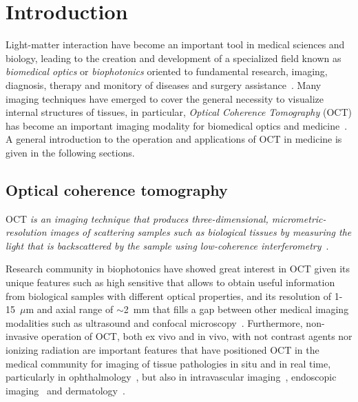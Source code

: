 \newpage
{}
\chapter{Introduction}\label{chap:intro}

Light-matter interaction have become an important tool in medical sciences and biology, leading to the creation and development of a specialized field known as \textit{biomedical optics} or \textit{biophotonics} oriented to fundamental research, imaging, diagnosis, therapy and monitory of diseases and surgery assistance~\cite{}. Many imaging techniques have emerged to cover the general necessity to visualize internal structures of tissues, in particular, \textit{Optical Coherence Tomography} (OCT) has become an important imaging modality for biomedical optics and medicine~\cite{}. A general introduction to the operation and applications of OCT in medicine is given in the following sections.

\section{Optical coherence tomography}

OCT \textit{is an imaging technique that produces three-dimensional, micrometric-resolution images of scattering samples such as biological tissues by measuring the light that is backscattered by the sample using low-coherence interferometry}~\cite{}.

Research community in biophotonics have showed great interest in OCT given its unique features such as high sensitive that allows to obtain useful information from biological samples with different optical properties, and its resolution of 1-15~$\mu$m and axial range of $\sim$2~mm that fills a gap between other medical imaging modalities such as ultrasound and confocal microscopy~\cite{}. Furthermore, non-invasive operation of OCT, both ex vivo and in vivo, with not contrast agents nor ionizing radiation are important features that have positioned OCT in the medical community for imaging of tissue pathologies in situ and in real time, particularly in ophthalmology~\cite{}, but also in intravascular imaging~\cite{}, endoscopic imaging~\cite{} and dermatology~\cite{}. 

